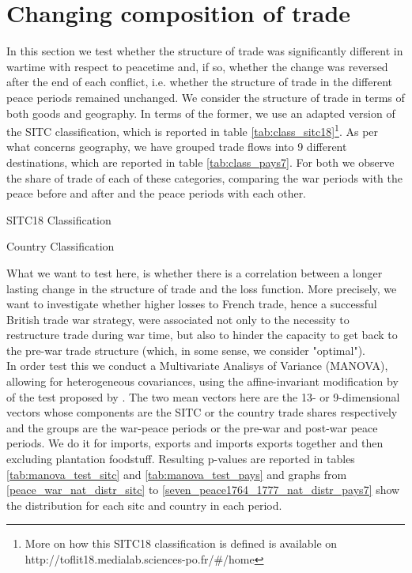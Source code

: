 \documentclass[12pt,a4paper,notitlepage,english]{article}
\begin{document}
\section{Changing composition of trade}  \label{composition}
In this section we test whether the structure of trade was significantly different in wartime with respect to peacetime and, if so, whether the change was reversed after the end of each conflict, i.e. whether the structure of trade in the different peace periods remained unchanged. 
We consider the structure of trade in terms of both goods and geography. 
In terms of the former, we use an adapted version of the SITC classification, which is reported in table \ref{tab:class_sitc18}\footnote{More on how this SITC18 classification is defined is available on http://toflit18.medialab.sciences-po.fr/\#/home}. As per what concerns geography, we have grouped trade flows into 9 different destinations, which are reported in table \ref{tab:class_pays7}. For both we observe the share of trade of each of these categories, comparing the war periods with the peace before and after and the peace periods with each other. 
\begin{table}[H]
\centering
\caption{SITC18 Classification}
\label{tab:class_sitc18}

\end{table}
\begin{table}[H]
\centering
\caption{Country Classification}
\label{tab:class_pay7}

\end{table}
What we want to test here, is whether there is a correlation between a longer lasting change in the structure of trade and the loss function. More precisely, we want to investigate whether higher losses to French trade, hence a successful British trade war strategy, were associated not only to the necessity to restructure trade during war time, but also to hinder the capacity to get back to the pre-war trade structure (which, in some sense, we consider "optimal"). \\
In order test this we conduct a Multivariate Analisys of Variance (MANOVA), allowing for heterogeneous covariances, using the affine-invariant modification by \cite{Krishnamoorthy2004} of the test proposed by \cite{Nel1986}. The two mean vectors here are the 13- or 9-dimensional vectors whose components are the SITC or the country trade shares respectively and the groups are the war-peace periods or the pre-war and post-war peace periods. 
We do it for imports, exports and imports exports together and then excluding plantation foodstuff. Resulting p-values are reported in tables \ref{tab:manova_test_sitc} and \ref{tab:manova_test_pays} and graphs from \ref{peace_war_nat_distr_sitc} to \ref{seven_peace1764_1777_nat_distr_pays7} show the distribution for each sitc and country in each period. \\
\end{document}
